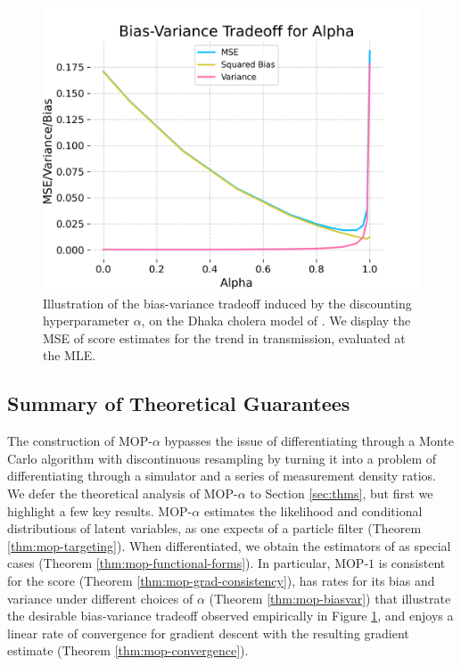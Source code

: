 \documentclass[9pt,twocolumn,pnasresearcharticle]{pnas-new}
\newcommand\arxiv[2]{#2} %
\begin{document}
\begin{figure}[ht!]
  \centering
    \includegraphics[width=\arxiv{10cm}{\textwidth/3}]{imgs/095/biasvar.png}
    \caption{Illustration of the bias-variance tradeoff induced by the discounting hyperparameter $\alpha$, on the Dhaka cholera model of \cite{king08}. We display the MSE of score estimates for the trend in transmission, evaluated at the MLE.}
    \label{fig:biasvar}
    \arxiv{}{\vspace*{-1ex}}
\end{figure}

\arxiv{}{\vspace*{-2mm}}
\subsection{Summary of Theoretical Guarantees}

The construction of MOP-$\alpha$ bypasses the issue of differentiating through a Monte Carlo algorithm with discontinuous resampling by turning it into a problem of differentiating through a simulator and a series of measurement density ratios.
We defer the theoretical analysis of MOP-$\alpha$ to Section \ref{sec:thms}, but first we highlight a few key results.
MOP-$\alpha$ estimates the likelihood and conditional distributions of latent variables, as one expects of a particle filter (Theorem \ref{thm:mop-targeting}).
When differentiated, we obtain the estimators of \cite{poyiadjis11, scibior21, naesseth18} as special cases (Theorem \ref{thm:mop-functional-forms}).
In particular, MOP-$1$ is consistent for the score (Theorem \ref{thm:mop-grad-consistency}), has rates for its bias and variance under different choices of $\alpha$ (Theorem \ref{thm:mop-biasvar}) that illustrate the desirable bias-variance tradeoff observed empirically in Figure \ref{fig:biasvar}, and enjoys a linear rate of convergence for gradient descent with the resulting gradient estimate (Theorem \ref{thm:mop-convergence}).  
\end{document}
